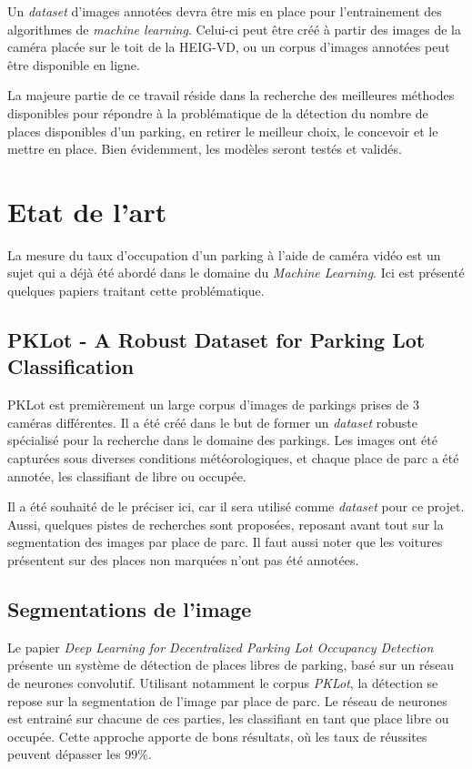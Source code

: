 Un \textit{dataset} d'images annotées devra être mis en place pour l'entrainement des algorithmes de \textit{machine learning}. Celui-ci peut être créé à partir des images de la caméra placée sur le toit de la HEIG-VD, ou un corpus d'images annotées peut être disponible en ligne.

La majeure partie de ce travail réside dans la recherche des meilleures méthodes disponibles pour répondre à la problématique de la détection du nombre de places disponibles d'un parking, en retirer le meilleur choix, le concevoir et le mettre en place. Bien évidemment, les modèles seront testés et validés.

\section{Etat de l'art}

La mesure du taux d'occupation d'un parking à l'aide de caméra vidéo est un sujet qui a déjà été abordé dans le domaine du \textit{Machine Learning}. Ici est présenté quelques papiers traitant cette problématique. 

\subsection{PKLot - A Robust Dataset for Parking Lot Classification}

PKLot est premièrement un large corpus d'images de parkings prises de 3 caméras différentes. Il a été créé dans le but de former un \textit{dataset} robuste spécialisé pour la recherche dans le domaine des parkings. Les images ont été capturées sous diverses conditions météorologiques, et chaque place de parc a été annotée, les classifiant de libre ou occupée.\autocite{paper:pklot}

Il a été souhaité de le préciser ici, car il sera utilisé comme \textit{dataset} pour ce projet. Aussi, quelques pistes de recherches sont proposées, reposant avant tout sur la segmentation des images par place de parc. Il faut aussi noter que les voitures présentent sur des places non marquées n'ont pas été annotées.

\subsection{Segmentations de l'image}
Le papier \textit{Deep Learning for Decentralized Parking Lot Occupancy Detection} présente un système de détection de places libres de parking, basé sur un réseau de neurones convolutif. Utilisant notamment le corpus \textit{PKLot}, la détection se repose sur la segmentation de l'image par place de parc. Le réseau de neurones est entrainé sur chacune de ces parties, les classifiant en tant que place libre ou occupée. Cette approche apporte de bons résultats, où les taux de réussites peuvent dépasser les 99\%. \autocite{paper:dlp}

